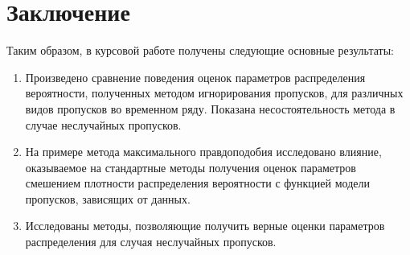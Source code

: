 \section{Заключение}

    Таким образом, в курсовой работе получены следующие основные результаты:
    \begin{enumerate}
        \item Произведено сравнение поведения оценок параметров распределения вероятности, полученных методом игнорирования пропусков, для различных видов пропусков во временном ряду. Показана несостоятельность метода в случае неслучайных пропусков. 
        \item На примере метода максимального правдоподобия исследовано влияние, оказываемое на стандартные методы получения оценок параметров смешением плотности распределения вероятности с функцией модели пропусков, зависящих от данных.
        \item Исследованы методы, позволяющие получить верные оценки параметров распределения для случая неслучайных пропусков.
    \end{enumerate}